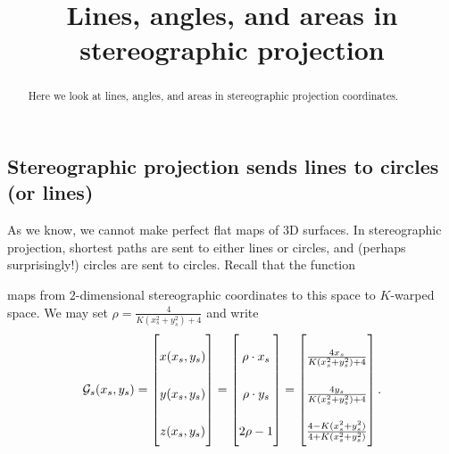 \documentclass[newpage,hints,12pt,noauthor,nooutcomes]{ximera}
\title{Lines, angles, and areas in stereographic projection}
\begin{document}
\begin{abstract}
Here we look at lines, angles, and areas in stereographic projection coordinates.
\end{abstract}
\maketitle


\subsection{Stereographic projection sends lines to circles (or lines)}

As we know, we cannot make perfect flat maps of 3D surfaces. In stereographic
projection, shortest paths are sent to either lines or circles, and (perhaps
surprisingly!) circles are sent to circles. Recall that the function
\begin{center}
\end{center}
maps from $2$-dimensional stereographic coordinates to this space to
$K$-warped space. We may set $\rho=\frac{4}{K(x_s^2 + y_s^2) + 4}$ and
write
\[
\toGs(x_s,y_s) = 
\begin{bmatrix}
x(x_s,y_s)  \\
y(x_s,y_s)  \\
z(x_s,y_s)  
\end{bmatrix}
=
\begin{bmatrix}
\rho  \cdot x_s  \\
\rho \cdot y_s  \\
2\rho -1
\end{bmatrix}
=
\renewcommand{\arraystretch}{2.5} %
\begin{bmatrix}
 \frac{4x_s}{K(x_s^2 + y_s^2) + 4}  \\
 \frac{4y_s}{K(x_s^2 + y_s^2) + 4} \\
\frac{4-K(x_s^2 + y_s^2)}{4+K(x_s^2 + y_s^2)}
\end{bmatrix}.
\]
\end{document}

